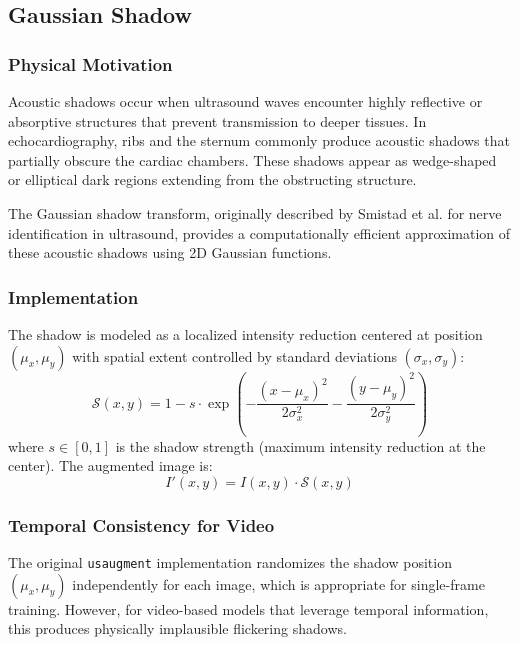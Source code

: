 \documentclass{article}
\theoremstyle{plain}
\theoremstyle{definition}
\theoremstyle{remark}
\begin{document}
\subsection{Gaussian Shadow}
\label{appendix:gaussian_shadow}

\subsubsection{Physical Motivation}

Acoustic shadows occur when ultrasound waves encounter highly reflective or absorptive structures that prevent transmission to deeper tissues. In echocardiography, ribs and the sternum commonly produce acoustic shadows that partially obscure the cardiac chambers. These shadows appear as wedge-shaped or elliptical dark regions extending from the obstructing structure.

The Gaussian shadow transform, originally described by Smistad et al. \cite{smistad2018} for nerve identification in ultrasound, provides a computationally efficient approximation of these acoustic shadows using 2D Gaussian functions.

\subsubsection{Implementation}

The shadow is modeled as a localized intensity reduction centered at position $(\mu_x, \mu_y)$ with spatial extent controlled by standard deviations $(\sigma_x, \sigma_y)$:
\begin{equation}
    \mathcal{S}(x, y) = 1 - s \cdot \exp\left( -\frac{(x - \mu_x)^2}{2\sigma_x^2} - \frac{(y - \mu_y)^2}{2\sigma_y^2} \right)
\end{equation}
where $s \in [0, 1]$ is the shadow strength (maximum intensity reduction at the center). The augmented image is:
\begin{equation}
    I'(x, y) = I(x, y) \cdot \mathcal{S}(x, y)
\end{equation}

\subsubsection{Temporal Consistency for Video}

The original \texttt{usaugment} implementation randomizes the shadow position $(\mu_x, \mu_y)$ independently for each image, which is appropriate for single-frame training. However, for video-based models that leverage temporal information, this produces physically implausible flickering shadows.
\end{document}
